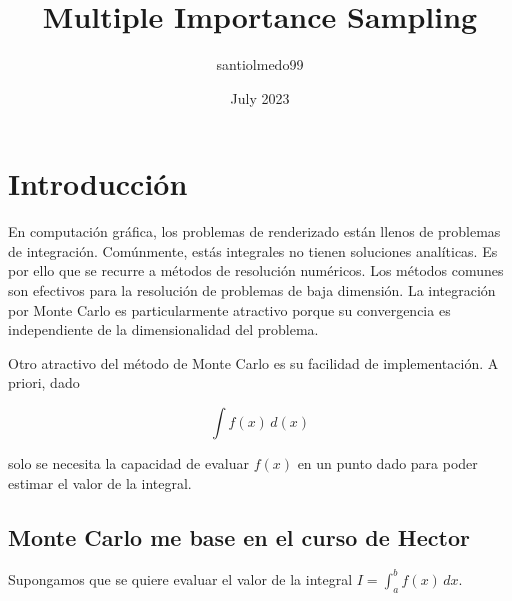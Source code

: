 \documentclass{article}
\title{Multiple Importance Sampling}
\author{santiolmedo99}
\date{July 2023}
\begin{document}
\maketitle

\section{Introducción}

En computación gráfica, los problemas de renderizado están llenos de problemas de integración. Comúnmente, estás integrales no tienen soluciones analíticas. Es por ello que se recurre a métodos de resolución numéricos. Los métodos comunes son efectivos para la resolución de problemas de baja dimensión. La integración por Monte Carlo es particularmente atractivo porque su convergencia es independiente de la dimensionalidad del problema.

Otro atractivo del método de Monte Carlo es su facilidad de implementación. A priori, dado

$$ \int f(x) \,d(x)$$

solo se necesita la capacidad de evaluar $f(x)$ en un punto dado para poder estimar el valor de la integral.

\subsection{Monte Carlo me base en el curso de Hector}
Supongamos que se quiere evaluar el valor de la integral $I = \int_{a}^{b} f(x) \,dx$.
\end{document}
